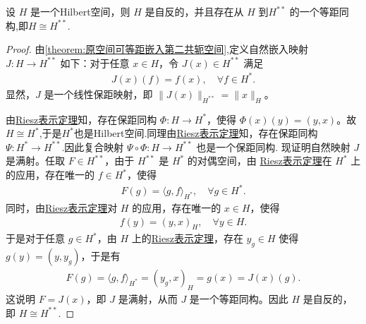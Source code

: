 \documentclass[../../main.tex]{subfiles}%
\begin{document}
\begin{proposition}
设 \(H\) 是一个Hilbert空间，则 \(H\) 是自反的，并且存在从 \(H\) 到\(H^{**}\) 的一个等距同构,即$H\cong H^{**}.$
\end{proposition}
\begin{proof}

由\cref{theorem:原空间可等距嵌入第二共轭空间},定义自然嵌入映射 \(J: H \to H^{**}\) 如下：对于任意 \(x \in H\)，令 \(J(x) \in H^{**}\) 满足
\begin{align}
J(x)(f) = f(x), \quad \forall f \in H^{*}.
\end{align}
显然，\(J\) 是一个线性保距映射，即 \(\|J(x)\|_{H^{**}} = \|x\|_{H}\)。

由\hyperref[theorem:Riesz表示定理-泛函]{Riesz表示定理}知，存在保距同构 \(\Phi: H \to H^{*}\)，使得 \(\Phi(x)(y) = (y, x)\)。故$H\cong H^*$,于是$H^*$也是Hilbert空间.同理由\hyperref[theorem:Riesz表示定理-泛函]{Riesz表示定理}知，存在保距同构 \(\Psi: H^{*} \to H^{**}\).因此复合映射 \(\Psi \circ \Phi: H \to H^{**}\) 也是一个保距同构.
现证明自然映射 \(J\) 是满射。任取 \(F \in H^{**}\)，由于 \(H^{**}\) 是 \(H^*\) 的对偶空间，由 \hyperref[theorem:Riesz表示定理(Hilbert空间)]{Riesz表示定理}在 \(H^*\) 上的应用，存在唯一的 \(f \in H^{*}\)，使得
\begin{align}
F(g) = \langle g, f \rangle_{H^*}, \quad \forall g \in H^{*}.
\end{align}
同时，由\hyperref[theorem:Riesz表示定理(Hilbert空间)]{Riesz表示定理}对 \(H\) 的应用，存在唯一的 \(x \in H\)，使得
\begin{align*}
f(y) = (y, x)_H, \quad \forall y \in H.
\end{align*}
于是对于任意 \(g \in H^{*}\)，由 \(H\) 上的\hyperref[theorem:Riesz表示定理(Hilbert空间)]{Riesz表示定理}，存在 \(y_g \in H\) 使得 \(g(y) = (y, y_g)\)，于是有
\begin{align*}
F(g) = \langle g, f \rangle_{H^*} = (y_g, x)_H = g(x) = J(x)(g).
\end{align*}
这说明 \(F = J(x)\)，即 \(J\) 是满射，从而 \(J\) 是一个等距同构。因此 \(H\) 是自反的，即 \(H \cong H^{**}\).
\end{proof}
\end{document}
